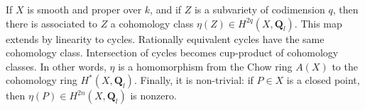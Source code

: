 If $X$ is smooth and proper over $k$, and if $Z$ is a subvariety of codimension $q$, then there is associated to $Z$ a cohomology class $\eta(Z) \in H^{2q}(X, \mathbf{Q}_l)$. This map extends by linearity to cycles. Rationally equivalent cycles have the same cohomology class. Intersection of cycles becomes cup-product of cohomology classes. In other words, $\eta$ is a homomorphism from the Chow ring $A(X)$ to the cohomology ring $H^*(X, \mathbf{Q}_l)$. Finally, it is non-trivial: if $P \in X$ is a closed point, then $\eta(P) \in H^{2n}(X, \mathbf{Q}_l)$ is nonzero.

